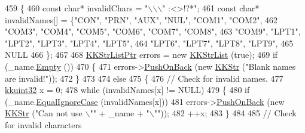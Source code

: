 \begin{DoxyCode}
459 \{
460   \textcolor{keyword}{const} \textcolor{keywordtype}{char}*  invalidChars = \textcolor{stringliteral}{"\(\backslash\)\(\backslash\)\(\backslash\)" :<>!?*"};
461   \textcolor{keyword}{const} \textcolor{keywordtype}{char}*  invalidNames[] = \{\textcolor{stringliteral}{"CON"},  \textcolor{stringliteral}{"PRN"},  \textcolor{stringliteral}{"AUX"},  \textcolor{stringliteral}{"NUL"},  \textcolor{stringliteral}{"COM1"}, \textcolor{stringliteral}{"COM2"}, 
462                                  \textcolor{stringliteral}{"COM3"}, \textcolor{stringliteral}{"COM4"}, \textcolor{stringliteral}{"COM5"}, \textcolor{stringliteral}{"COM6"}, \textcolor{stringliteral}{"COM7"}, \textcolor{stringliteral}{"COM8"}, 
463                                  \textcolor{stringliteral}{"COM9"}, \textcolor{stringliteral}{"LPT1"}, \textcolor{stringliteral}{"LPT2"}, \textcolor{stringliteral}{"LPT3"}, \textcolor{stringliteral}{"LPT4"}, \textcolor{stringliteral}{"LPT5"},
464                                  \textcolor{stringliteral}{"LPT6"}, \textcolor{stringliteral}{"LPT7"}, \textcolor{stringliteral}{"LPT8"}, \textcolor{stringliteral}{"LPT9"}, 
465                                  NULL
466                                 \}; 
467 
468   \hyperlink{class_k_k_b_1_1_k_k_str_list}{KKStrListPtr}  errors = \textcolor{keyword}{new} \hyperlink{class_k_k_b_1_1_k_k_str_list}{KKStrList} (\textcolor{keyword}{true});
469   \textcolor{keywordflow}{if}  (\_name.\hyperlink{class_k_k_b_1_1_k_k_str_ac69942f73fffd672ec2a6e1c410afdb6}{Empty} ())
470   \{
471     errors->\hyperlink{class_k_k_b_1_1_k_k_queue_aa9fba4632b54268bf71ecb42dee0b575}{PushOnBack} (\textcolor{keyword}{new} \hyperlink{class_k_k_b_1_1_k_k_str}{KKStr} (\textcolor{stringliteral}{"Blank names are invalid!"}));
472   \}
473 
474   \textcolor{keywordflow}{else}
475   \{
476     \textcolor{comment}{// Check for invalid names.}
477     \hyperlink{namespace_k_k_b_af8d832f05c54994a1cce25bd5743e19a}{kkuint32}  x = 0;
478     \textcolor{keywordflow}{while}  (invalidNames[x] != NULL)
479     \{
480       \textcolor{keywordflow}{if}  (\_name.\hyperlink{class_k_k_b_1_1_k_k_str_a562f9696417c53f66bc4088eac072ab5}{EqualIgnoreCase} (invalidNames[x]))
481         errors->\hyperlink{class_k_k_b_1_1_k_k_queue_aa9fba4632b54268bf71ecb42dee0b575}{PushOnBack} (\textcolor{keyword}{new} \hyperlink{class_k_k_b_1_1_k_k_str}{KKStr} (\textcolor{stringliteral}{"Can not use \(\backslash\)""} + \_name + \textcolor{stringliteral}{"\(\backslash\)""}));
482       ++x;
483     \}
484 
485     \textcolor{comment}{// Check for invalid characters}

\end{DoxyCode}
